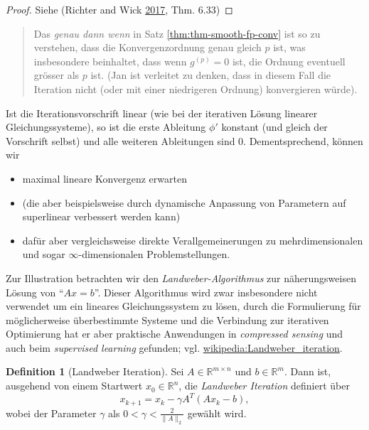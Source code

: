 \documentclass[
]{book}
\providecommand{\tightlist}{%
  \setlength{\itemsep}{0pt}\setlength{\parskip}{0pt}}
\newenvironment {JHSAYS} [0] {\begin{quote}\color{jhsc}} {\end{quote}}
\theoremstyle{definition}
\newtheorem{definition}{Definition}[chapter]
\theoremstyle{definition}
\theoremstyle{definition}
\theoremstyle{definition}
\theoremstyle{remark}
\begin{document}
\begin{proof}
Siehe (Richter and Wick \protect\hyperlink{ref-RicW17}{2017}, Thm. 6.33)
\end{proof}

\leavevmode\hypertarget{rem-smooth-fp-conv}{}%
\begin{JHSAYS}
Das \emph{genau dann wenn} in Satz \ref{thm:thm-smooth-fp-conv} ist so zu verstehen, dass die Konvergenzordnung genau gleich \(p\) ist, was insbesondere beinhaltet, dass wenn \(g^{(p)}=0\) ist, die Ordnung eventuell grösser als \(p\) ist. (Jan ist verleitet zu denken, dass in diesem Fall die Iteration nicht (oder mit einer niedrigeren Ordnung) konvergieren würde).

\end{JHSAYS}

Ist die Iterationsvorschrift linear (wie bei der iterativen Lösung linearer Gleichungssysteme), so ist die erste Ableitung \(\phi'\) konstant (und gleich der Vorschrift selbst) und alle weiteren Ableitungen sind \(0\). Dementsprechend, können wir

\begin{itemize}
\tightlist
\item
  maximal lineare Konvergenz erwarten
\item
  (die aber beispielsweise durch dynamische Anpassung von Parametern auf superlinear verbessert werden kann)
\item
  dafür aber vergleichsweise direkte Verallgemeinerungen zu mehrdimensionalen und sogar \(\infty\)-dimensionalen Problemstellungen.
\end{itemize}

Zur Illustration betrachten wir den \emph{Landweber-Algorithmus} zur näherungsweisen Lösung von ``\(Ax=b\)''.
Dieser Algorithmus wird zwar insbesondere nicht verwendet um ein lineares Gleichungssystem zu lösen, durch die Formulierung für möglicherweise überbestimmte Systeme und die Verbindung zur iterativen Optimierung hat er aber praktische Anwendungen in \emph{compressed sensing} und auch beim \emph{supervised learning} gefunden; vgl. \href{https://en.wikipedia.org/wiki/Landweber_iteration}{wikipedia:Landweber\_iteration}.

\begin{definition}[Landweber Iteration]
\protect\hypertarget{def:def-landweber-alg}{}\label{def:def-landweber-alg}Sei \(A\in \mathbb R^{m\times n}\) und \(b\in \mathbb R^{m}\). Dann ist, ausgehend von einem Startwert \(x_0 \in \mathbb R^{n}\), die \emph{Landweber Iteration} definiert über
\begin{equation*}
x_{k+1} = x_k - \gamma A^T(Ax_k -b ),
\end{equation*}
wobei der Parameter \(\gamma\) als \(0<\gamma< \frac{2}{\|A\|_2}\) gewählt wird.
\end{definition}
\end{document}
